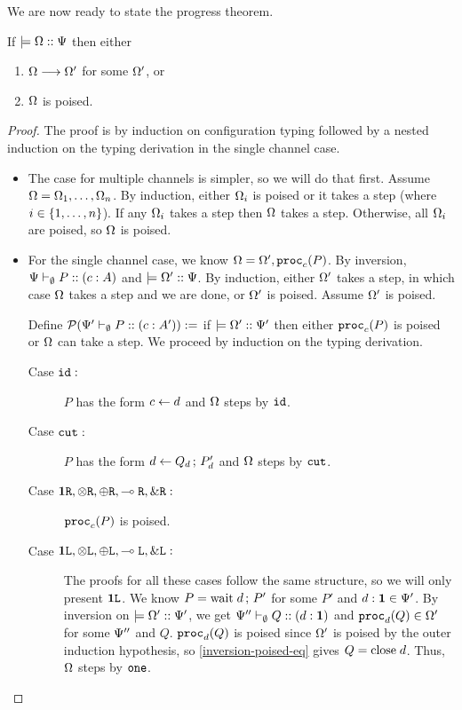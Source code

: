 We are now ready to state the progress theorem.

\begin{theorem}[Progress]
\label{base:progress}
If $\models {\Omega} :: {\Psi}$ then either
\begin{enumerate}
  \item $\Omega \longrightarrow \Omega'$ for some $\Omega'$, or
  \item $\Omega$ is poised.
\end{enumerate}
\end{theorem}

\begin{proof}
The proof is by induction on configuration typing followed by a nested induction on the typing derivation in the single channel case.

\begin{itemize}
  \item The case for multiple channels is simpler, so we will do that first. Assume $\Omega = \Omega_1, \ldots, \Omega_n$. By induction, either $\Omega_i$ is poised or it takes a step (where $i \in \lbrace1, \ldots, n\rbrace$). If any $\Omega_i$ takes a step then $\Omega$ takes a step. Otherwise, all $\Omega_i$ are poised, so $\Omega$ is poised.

  \item For the single channel case, we know $\Omega = \Omega', \mathtt{proc}_{c}(P)$. By inversion, ${\Psi} \vdash_{\emptyset} P :: (c : A)$ and $\models {\Omega'} :: {\Psi}$. By induction, either $\Omega'$ takes a step, in which case $\Omega$ takes a step and we are done, or $\Omega'$ is poised. Assume $\Omega'$ is poised.

  Define $\pred{\typeRecD{\ctx'}{\emptyset}{P}{c}{A'}} :=$ if $\models {\Omega'} :: {\Psi'}$ then either $\mathtt{proc}_{c}(P)$ is poised or $\Omega$ can take a step. We proceed by induction on the typing derivation.
    \begin{description}
      \item[Case $\texttt{id}:$] $P$ has the form $c \leftarrow d$ and $\Omega$ steps by $\texttt{id}$.
      \item[Case $\texttt{cut}:$] $P$ has the form $d \leftarrow Q_d \,;\, P'_d$ and $\Omega$ steps by $\texttt{cut}$.

      \item[Case $\mathbf{1}\texttt{R}, \otimes\texttt{R}, \oplus\texttt{R}, \multimap\texttt{R}, \&\texttt{R} :$] $\mathtt{proc}_{c}(P)$ is poised.

      \item[Case $\mathbf{1}\texttt{L}, \otimes\texttt{L}, \oplus\texttt{L}, \multimap\texttt{L}, \&\texttt{L} :$] The proofs for all these cases follow the same structure, so we will only present $\mathbf{1}\texttt{L}$. We know $P = \mathrm{wait}\;d \,;\, P'$ for some $P'$ and $d : \mathbf{1} \in \Psi'$. By inversion on $\models {\Omega'} :: {\Psi'}$, we get ${\Psi''} \vdash_{\emptyset} Q :: (d : \mathbf{1})$ and $\mathtt{proc}_{d}(Q) \in \Omega'$ for some $\Psi''$ and $Q$. $\mathtt{proc}_{d}(Q)$ is poised since $\Omega'$ is poised by the outer induction hypothesis, so \cref{inversion-poised-eq} gives $Q = \mathrm{close}\;d$. Thus, $\Omega$ steps by $\texttt{one}$.


\end{description}
\end{itemize}
\end{proof}
